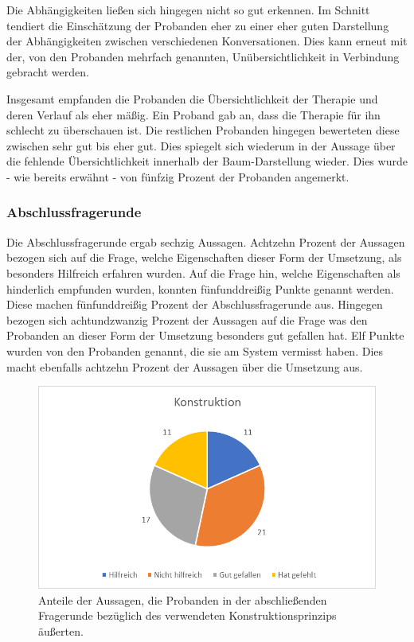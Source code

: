 Die Abhängigkeiten ließen sich hingegen nicht so gut erkennen. Im Schnitt tendiert die Einschätzung der Probanden eher zu einer eher guten Darstellung der Abhängigkeiten zwischen verschiedenen Konversationen. Dies kann erneut mit der, von den Probanden mehrfach genannten, Unübersichtlichkeit in Verbindung gebracht werden. 

Insgesamt empfanden die Probanden die Übersichtlichkeit der Therapie und deren Verlauf als eher mäßig. Ein Proband gab an, dass die Therapie für ihn schlecht zu überschauen ist. Die restlichen Probanden hingegen bewerteten diese zwischen sehr gut bis eher gut. Dies spiegelt sich wiederum in der Aussage über die fehlende Übersichtlichkeit innerhalb der Baum-Darstellung wieder. Dies wurde - wie bereits erwähnt - von fünfzig Prozent der Probanden angemerkt. 

\subsubsection{Abschlussfragerunde}
Die Abschlussfragerunde ergab sechzig Aussagen. Achtzehn Prozent der Aussagen bezogen sich auf die Frage, welche Eigenschaften dieser Form der Umsetzung, als besonders Hilfreich erfahren wurden. Auf die Frage hin, welche Eigenschaften als hinderlich empfunden wurden, konnten fünfunddreißig Punkte genannt werden. Diese machen fünfunddreißig Prozent der Abschlussfragerunde aus. Hingegen bezogen sich achtundzwanzig Prozent der Aussagen auf die Frage was den Probanden an dieser Form der Umsetzung besonders gut gefallen hat. Elf Punkte wurden von den Probanden genannt, die sie am System vermisst haben. Dies macht ebenfalls achtzehn Prozent der Aussagen über die Umsetzung aus. 

\begin{figure}[h]
\centering
\includegraphics[width=1\textwidth]{pictures/diagramme/aussagenkonstr}
\caption{Anteile der Aussagen, die Probanden in der abschließenden Fragerunde bezüglich des verwendeten Konstruktionsprinzips äußerten.}
\label{aussagensichtb}
\end{figure}



